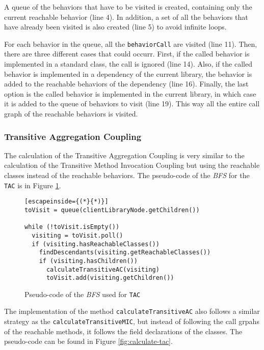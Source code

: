 A queue of the behaviors that have to be visited is created, containing only the current reachable behavior (line 4). In addition, a set of all the behaviors that have already been visited is also created (line 5) to avoid infinite loops.

For each behavior in the queue, all the \texttt{behaviorCall} are visited (line 11). Then, there are three different cases that could occurr. First, if the called behavior is implemented in a standard class, the call is ignored (line 14). Also, if the called behavior is implemented in a dependency of the current library, the behavior is added to the reachable behaviors of the dependency (line 16). Finally, the last option is the called behavior is implemented in the current library, in which case it is added to the queue of behaviors to visit (line 19). This way all the entire call graph of the reachable behaviors is visited.

\subsubsection{Transitive Aggregation Coupling}

The calculation of the Transitive Aggregation Coupling is very similar to the calculation of the Transitive Method Invocation Coupling but using the reachable classes instead of the reachable behaviors. The pseudo-code of the \textit{BFS} for the \texttt{TAC} is in Figure \ref{fig:tree-traversing-tac}.

\begin{figure}[ht!]
\begin{lstlisting}[escapeinside={(*}{*)}]
toVisit = queue(clientLibraryNode.getChildren())

while (!toVisit.isEmpty())
  visiting = toVisit.poll()
  if (visiting.hasReachableClasses())
    findDescendants(visiting.getReachableClasses())
    if (visiting.hasChildren())
      calculateTransitiveAC(visiting)
      toVisit.add(visiting.getChildren())
\end{lstlisting}
\caption{Pseudo-code of the \textit{BFS} used for \texttt{TAC}}
\label{fig:tree-traversing-tac}
\end{figure}

The implementation of the method \texttt{calculateTransitiveAC} also follows a similar strategy as the \texttt{calculateTransitiveMIC}, but instead of following the call grpahs of the reachable methods, it follows the field declarations of the classes. The pseudo-code can be found in Figure \ref{fig:calculate-tac}.

